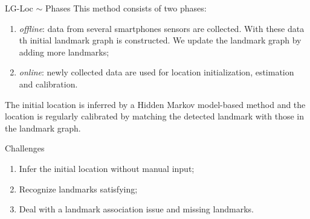 \begin{frame}{LG-Loc $\sim$ Phases}
    This method consists of two phases:

    \begin{enumerate}
        \item \textit{offline}: data from several smartphones sensors are collected. With these data th initial landmark graph is constructed. We update the landmark graph by adding more landmarks;
        \item \textit{online}: newly collected data are used for location initialization, estimation and calibration.
    \end{enumerate} 

    The initial location is inferred by a Hidden Markov model-based method and the location is regularly calibrated by matching the detected landmark with those in the landmark graph. 
\end{frame}

\begin{frame}{Challenges}
    \begin{enumerate}
        \item Infer the initial location without manual input;
        \item Recognize landmarks satisfying;
        \item Deal with a landmark association issue and missing landmarks.
    \end{enumerate}
\end{frame}